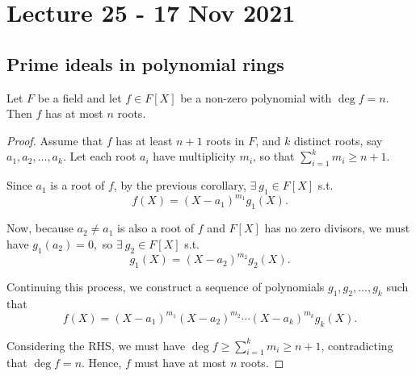 \section{Lecture 25 - 17 Nov 2021 }
\subsection{Prime ideals in polynomial rings}
\begin{theorem}
  Let $F$ be a field and let $f\in F[X]$ be a non-zero polynomial with $\deg f = n$. Then
  $f$ has at most $n$ roots.
  \label{<+label+>}
\end{theorem}
\begin{proof}
  Assume that $f$ has at least $n+1$ roots in $F$, and $k$ distinct roots, say $a_1, a_2, \ldots, a_{k}$. Let each root $a_i$ have multiplicity $m_i$, so that $\sum_{i=1}^k m_i \geq n+1$. 

Since $a_1$ is a root of $f$, by the previous corollary, $\exists \: g_1 \in F[X]$ s.t.
$$ f(X) = (X - a_1)^{m_1}g_1(X). $$

Now, because $a_2 \neq a_1$ is also a root of $f$ and $F[X]$ has no zero divisors, we must have $g_1(a_2) = 0,$ so $\exists \: g_2 \in F[X]$ s.t.
$$ g_1(X) = (X - a_2)^{m_2}g_2(X). $$

Continuing this process, we construct a sequence of polynomials $g_1, g_2, \ldots, g_k$ such that
$$ f(X) = (X - a_1)^{m_1}(X - a_2)^{m_2}\cdots(X - a_k)^{m_k}g_k(X). $$






Considering the RHS, we must have $\deg f \geq \sum_{i=1}^k m_i \geq n+1$, contradicting that $\deg f = n$. Hence, $f$ must have at most $n$ roots.
\end{proof}

